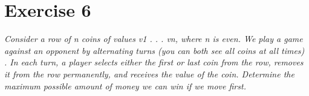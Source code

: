 \documentclass{amsart}
\begin{document}
\section{Exercise 6}
\emph{
    Consider a row of n coins of values v1 . . . vn, where n is even. We play a game against an opponent by alternating turns (you can both see all coins 
    at all times) . In each turn, a player selects either the first or last coin from the row, removes it from the row permanently, and receives the value
    of the coin. Determine the maximum possible amount of money we can win if we move first.
}
\end{document}
